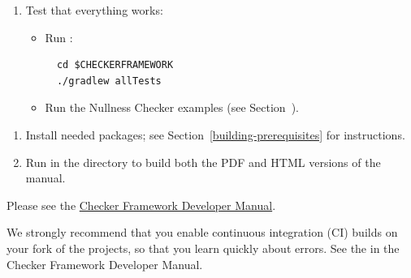 \begin{enumerate}
To use it, set your \<PATH> to use \<javac> in the \<bin-devel> directory:

\begin{Verbatim}
export PATH=$CHECKERFRAMEWORK/checker/bin-devel:${PATH}
\end{Verbatim}

The developer version of \<javac> allows you to not have to rebuild
the jar files after every code change, in turn allowing you to test
your changes faster. Source files can be compiled using command \<./gradlew
compileJava>, or can be automatically compiled by
an IDE such as Eclipse.

\item Test that everything works:

  \begin{itemize}

  \item Run :
\begin{Verbatim}
  cd $CHECKERFRAMEWORK
  ./gradlew allTests
\end{Verbatim}

  \item Run the Nullness Checker examples (see
    Section~).

  \end{itemize}

\end{enumerate}



\begin{enumerate}
\item
Install needed packages; see Section~\ref{building-prerequisites} for
instructions.

\item
Run  in the  directory to build both the PDF and HTML versions of the manual.
\end{enumerate}



Please see the
\href{https://rawgit.com/typetools/checker-framework/master/docs/developer/developer-manual.html}{Checker Framework Developer Manual}.



We strongly recommend that you enable continuous integration (CI) builds on
your fork of the projects, so that you learn quickly about errors.  See the
 in the Checker Framework Developer Manual.

